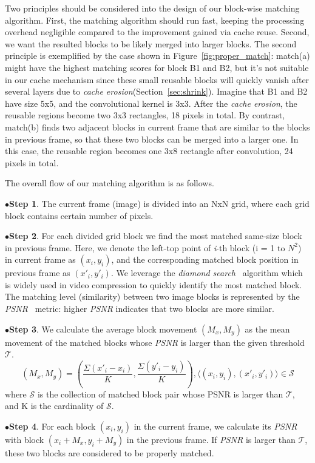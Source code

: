 \documentclass[10pt,acmtog]{acmart}
\newcommand{\shrink}{\emph{cache erosion}\xspace}
\newcommand{\revise}[1]{{#1}}
\begin{document}
Two principles should be considered into the design of our block-wise matching algorithm.
First, the matching algorithm should run fast, keeping the processing overhead negligible compared to the improvement gained via cache reuse.
Second, we want the resulted blocks to be likely merged into larger blocks.
The second principle is exemplified by the case shown in Figure~\ref{fig:proper_match}: match(a) might have the highest matching scores for block B1 and B2, but it's not suitable in our cache mechanism since these small reusable blocks will quickly vanish after several layers due to \shrink (Section~\ref{sec:shrink}).
Imagine that B1 and B2 have size 5x5, and the convolutional kernel is 3x3.
After the \shrink, the reusable regions become two 3x3 rectangles, 18 pixels in total.
\revise{By contrast, match(b) finds two adjacent blocks in current frame that are similar to the blocks in previous frame, so that these two blocks can be merged into a larger one.
In this case, the reusable region becomes one 3x8 rectangle after convolution, 24 pixels in total.}

The overall flow of our matching algorithm is as follows.

\noindent$\bullet$\textbf{Step 1}. The current frame (image) is divided into an NxN grid, where each grid block contains certain number of pixels.

\noindent$\bullet$\textbf{Step 2}. For each divided grid block we find the most matched same-size block in previous frame.
Here, we denote the left-top point of \emph{i}-th block (i = 1 to $N^2$) in current frame as $(x_i,y_i)$, and the corresponding matched block position in previous frame as $(x'_i,y'_i)$.
We leverage the \emph{diamond search}~\cite{zhu1997new} algorithm which is widely used in video compression to quickly identify the most matched block.
The matching level (similarity) between two image blocks is represented by the \emph{PSNR}~\cite{zhu1997new} metric: higher \emph{PSNR} indicates that two blocks are more similar.

\noindent$\bullet$\textbf{Step 3}. We calculate the average block movement $(M_x, M_y)$ as the mean movement of the matched blocks whose \emph{PSNR} is larger than the given threshold $\mathcal{T}$.
\[(M_x,M_y)=(\dfrac{\Sigma{(x'_i-x_i)}}{K},\dfrac{\Sigma{(y'_i-y_i)}}{K}), \langle (x_i,y_i),(x'_i,y'_i) \rangle \in \mathcal{S}\]
where $\mathcal{S}$ is the collection of matched block pair whose PSNR is larger than $\mathcal{T}$, and K is the cardinality of $\mathcal{S}$.

\noindent$\bullet$\textbf{Step 4}. For each block $(x_i,y_i)$ in the current frame, we calculate its \emph{PSNR} with block $(x_i+M_x,y_i+M_y)$ in the previous frame.
If \emph{PSNR} is larger than $\mathcal{T}$, these two blocks are considered to be properly matched.
\end{document}
